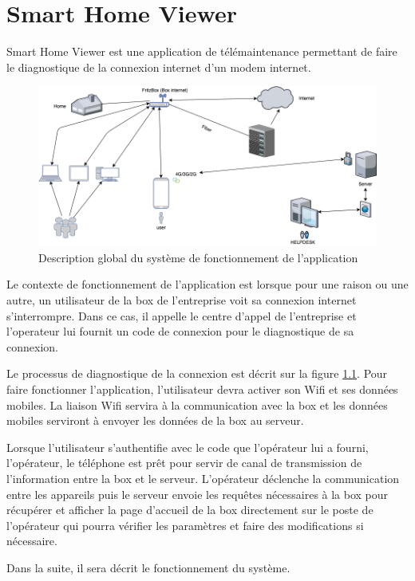 \chapter{Smart Home Viewer}
Smart Home Viewer est une application de télémaintenance permettant de faire le diagnostique de la connexion internet d'un modem internet.
\begin{figure}[H]
	\centering
	\includegraphics[scale=0.4]{assets/images/shv.png}
	\caption{Description global du système de fonctionnement de l'application}
	\label{fig.3}
\end{figure} 
Le contexte de fonctionnement de l'application est lorsque pour une raison ou une autre, un utilisateur de la box de l'entreprise voit sa connexion internet s'interrompre. Dans ce cas, il appelle le centre d'appel de l'entreprise et l'operateur lui fournit un code de connexion pour le diagnostique de sa connexion.

Le processus de diagnostique de la connexion est décrit sur la figure \ref{fig.3}. Pour faire fonctionner l'application, l'utilisateur devra activer son Wifi et ses données mobiles. La liaison Wifi servira à la communication avec la box et les données mobiles serviront à envoyer les données de la box au serveur.

Lorsque l'utilisateur s'authentifie avec le code que l'opérateur lui a fourni, l'opérateur, le téléphone est prêt pour servir de canal de transmission de l'information entre la box et le serveur. L'opérateur déclenche la communication entre les appareils puis le serveur envoie les requêtes nécessaires à la box pour récupérer et afficher la page d'accueil de la box directement sur le poste de l'opérateur qui pourra vérifier les paramètres et faire des modifications si nécessaire.

Dans la suite, il sera décrit le fonctionnement du système.
